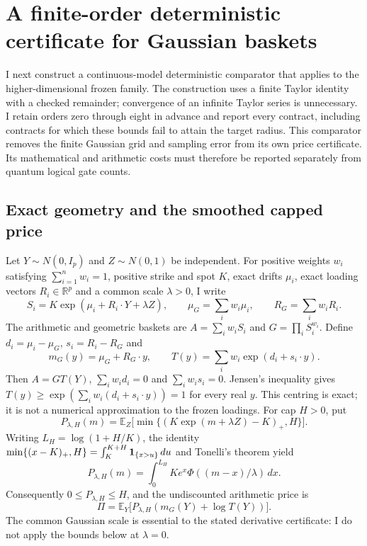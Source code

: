 \section{A finite-order deterministic certificate for Gaussian baskets}
\label{sec:taylor-continuous-certificate}

I next construct a continuous-model deterministic comparator that applies to the higher-dimensional frozen family. The construction uses a finite Taylor identity with a checked remainder; convergence of an infinite Taylor series is unnecessary. I retain orders zero through eight in advance and report every contract, including contracts for which these bounds fail to attain the target radius. This comparator removes the finite Gaussian grid and sampling error from its own price certificate. Its mathematical and arithmetic costs must therefore be reported separately from quantum logical gate counts.

\subsection{Exact geometry and the smoothed capped price}
\label{sec:taylor-geometry}

Let $Y\sim N(0,I_p)$ and $Z\sim N(0,1)$ be independent. For positive weights $w_i$ satisfying $\sum_{i=1}^n w_i=1$, positive strike and spot $K$, exact drifts $\mu_i$, exact loading vectors $R_i\in\mathbb R^p$ and a common scale $\lambda>0$, I write
\[
 S_i=K\exp(\mu_i+R_i\cdot Y+\lambda Z),\qquad
 \mu_G=\sum_i w_i\mu_i,\qquad R_G=\sum_iw_iR_i.
\]
The arithmetic and geometric baskets are $A=\sum_iw_iS_i$ and $G=\prod_i S_i^{w_i}$. Define $d_i=\mu_i-\mu_G$, $s_i=R_i-R_G$ and
\[
 m_G(y)=\mu_G+R_G\cdot y,\qquad
 T(y)=\sum_iw_i\exp(d_i+s_i\cdot y).
\]
Then $A=GT(Y)$, $\sum_iw_id_i=0$ and $\sum_iw_is_i=0$. Jensen's inequality gives $T(y)\geq\exp(\sum_iw_i(d_i+s_i\cdot y))=1$ for every real $y$. This centring is exact; it is not a numerical approximation to the frozen loadings. For cap $H>0$, put
\[
 P_{\lambda,H}(m)=\mathbb E_Z\bigl[\min\{(K\exp(m+\lambda Z)-K)_+,H\}\bigr].
\]
Writing $L_H=\log(1+H/K)$, the identity $\min\{(x-K)_+,H\}=\int_K^{K+H}{\bf1}_{\{x>u\}}\,du$ and Tonelli's theorem yield
\begin{equation}
 P_{\lambda,H}(m)=\int_0^{L_H}K e^x\Phi((m-x)/\lambda)\,dx.
 \label{eq:taylor-strike-integral}
\end{equation}
Consequently $0\leq P_{\lambda,H}\leq H$, and the undiscounted arithmetic price is
\begin{equation}
 \Pi=\mathbb E_Y\bigl[P_{\lambda,H}(m_G(Y)+\log T(Y))\bigr].
 \label{eq:taylor-price-target}
\end{equation}
The common Gaussian scale is essential to the stated derivative certificate: I do not apply the bounds below at $\lambda=0$.

